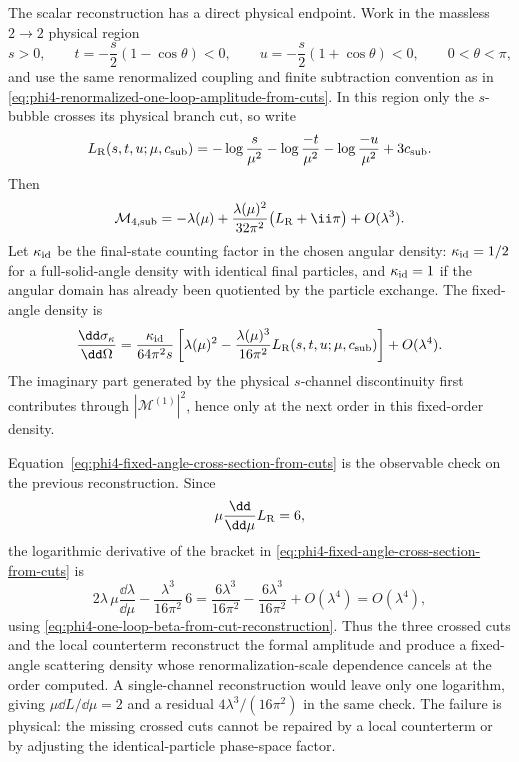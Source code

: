 \begin{controlledapproximation}
\label{ca:phi4-fixed-angle-cross-section-rg-check}
The scalar reconstruction has a direct physical endpoint.  Work in the
massless \(2\to2\) physical region
\[
  s>0,\qquad
  t=-\frac{s}{2}(1-\cos\theta)<0,\qquad
  u=-\frac{s}{2}(1+\cos\theta)<0,
  \qquad 0<\theta<\pi ,
\]
and use the same renormalized coupling and finite subtraction convention as in
\eqref{eq:phi4-renormalized-one-loop-amplitude-from-cuts}.  In this region
only the \(s\)-bubble crosses its physical branch cut, so write
\begin{equation}
  L_{\rm R}(s,t,u;\mu,c_{\rm sub})
  =
  -\log\frac{s}{\mu^2}
  -\log\frac{-t}{\mu^2}
  -\log\frac{-u}{\mu^2}
  +3c_{\rm sub}.
  \label{eq:phi4-fixed-angle-real-log-combination}
\end{equation}
Then
\[
  \mathcal M_{4,\rm sub}
  =
  -\lambda(\mu)
  +
  \frac{\lambda(\mu)^2}{32\pi^2}
  \bigl(L_{\rm R}+\ii\pi\bigr)
  +O(\lambda^3).
\]
Let \(\kappa_{\rm id}\) be the final-state counting factor in the chosen
angular density: \(\kappa_{\rm id}=1/2\) for a full-solid-angle density with
identical final particles, and \(\kappa_{\rm id}=1\) if the angular domain has
already been quotiented by the particle exchange.  The fixed-angle density is
\begin{equation}
  \frac{\dd\sigma_\kappa}{\dd\Omega}
  =
  \frac{\kappa_{\rm id}}{64\pi^2s}
  \left[
    \lambda(\mu)^2
    -
    \frac{\lambda(\mu)^3}{16\pi^2}
    L_{\rm R}(s,t,u;\mu,c_{\rm sub})
  \right]
  +O(\lambda^4).
  \label{eq:phi4-fixed-angle-cross-section-from-cuts}
\end{equation}
The imaginary part generated by the physical \(s\)-channel discontinuity first
contributes through \(|\mathcal M^{(1)}|^2\), hence only at the next order in
this fixed-order density.

Equation~\eqref{eq:phi4-fixed-angle-cross-section-from-cuts} is the observable
check on the previous reconstruction.  Since
\[
  \mu\frac{\dd}{\dd\mu}L_{\rm R}=6,
\]
the logarithmic derivative of the bracket in
\eqref{eq:phi4-fixed-angle-cross-section-from-cuts} is
\[
  2\lambda\,\mu\frac{\dd\lambda}{\dd\mu}
  -
  \frac{\lambda^3}{16\pi^2}\,6
  =
  \frac{6\lambda^3}{16\pi^2}
  -
  \frac{6\lambda^3}{16\pi^2}
  +O(\lambda^4)=O(\lambda^4),
\]
using \eqref{eq:phi4-one-loop-beta-from-cut-reconstruction}.  Thus the three
crossed cuts and the local counterterm reconstruct the formal amplitude and
produce a fixed-angle scattering density whose
renormalization-scale dependence cancels at the order computed.  A
single-channel reconstruction would leave only one logarithm, giving
\(\mu\dd L/\dd\mu=2\) and a residual \(4\lambda^3/(16\pi^2)\) in the same
check.  The failure is physical: the missing crossed cuts cannot be repaired
by a local counterterm or by adjusting the identical-particle phase-space
factor.
\end{controlledapproximation}

